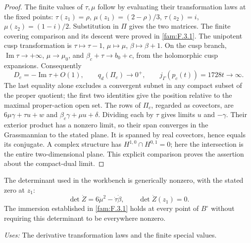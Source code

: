 \begin{proof}
The finite values of $\tau,\mu$ follow by evaluating their transformation
laws at the fixed points: $\tau(z_1)=\rho$,
$\mu(z_1)=(2-\rho)/3$, $\tau(z_2)=i$,
$\mu(z_2)=(1-i)/2$.  Substitution in $\Pi$ gives the two matrices.
The finite covering comparison and its descent were proved in \ref{fam:F.3.1}.
The unipotent cusp transformation is
$\tau\mapsto\tau-1$, $\mu\mapsto\mu$, $\beta\mapsto\beta+1$.
On the cusp branch, $\operatorname{Im}\tau\to+\infty$,
$\mu\to\mu_0$, and $\beta_c+\tau\to b_0+c$, from the holomorphic
cusp expansions.  Consequently
\[
 D_c=-\operatorname{Im}\tau+O(1),\qquad
 q_d(\Pi_c)\longrightarrow0^+,
 \qquad j_\Gamma(p_c(t))=1728t\longrightarrow\infty.
\]
The last equality alone excludes a convergent subnet in any compact
subset of the proper quotient; the first two identities give the
position relative to the maximal proper-action open set.
The rows of $\Pi_c$, regarded as covectors, are
$6\mu\gamma+\tau u+w$ and $\beta_c\gamma+\mu u+\delta$.
Dividing each by $\tau$ gives limits $u$ and $-\gamma$.
Their exterior product has a nonzero limit, so their span converges
in the Grassmannian to the stated plane.  It is spanned by real
covectors, hence equals its conjugate.  A complex structure has
$H^{1,0}\cap H^{0,1}=0$; here the intersection is the entire
two-dimensional plane.  This explicit comparison proves the assertion
about the compact-dual limit.
\end{proof}

\begin{proposition}[FAM F.3.3; T]\label{fam:F.3.3}
The determinant used in the workbench is generically nonzero, with
the stated zero at $z_1$:
\[
 \det\dot Z=6\dot\mu^2-\dot\tau\dot\beta,\qquad
 \det\dot Z(z_1)=0.
\]
The immersion established in \ref{fam:F.3.1} holds at every point of $B^\circ$
without requiring this determinant to be everywhere nonzero.
\end{proposition}
\noindent\emph{Uses:} The derivative transformation laws and the finite special values.\par

